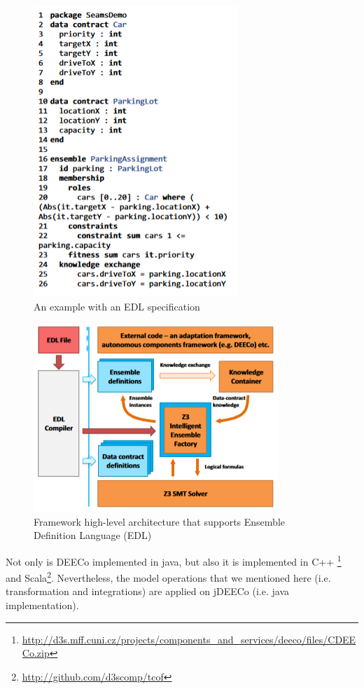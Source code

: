 \begin{figure}[!h]
\centering
\includegraphics[scale=0.75]{figures/edlspec}
\caption{An example with an EDL specification}
\label{fig:ros}
\end{figure}


\begin{figure}[!h]
\centering
\includegraphics[width=\textwidth]{figures/edl}
\caption{Framework high-level architecture that supports Ensemble Definition Language (EDL)}
\label{fig:ros}
\end{figure}

Not only is DEECo implemented in java, but also it is implemented in C++ \footnote{\url{http://d3s.mff.cuni.cz/projects/components_and_services/deeco/files/CDEECo.zip}} and Scala\footnote{\url{ http://github.com/d3scomp/tcof}}. Nevertheless, the model operations that we mentioned here (i.e. transformation and integrations) are applied on jDEECo (i.e. java implementation).


